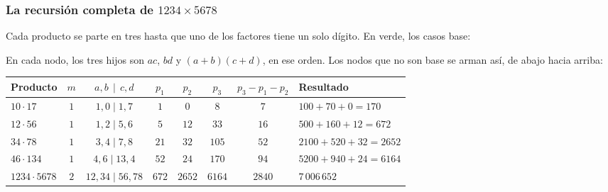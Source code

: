 \documentclass[11pt,letterpaper]{article}
\begin{document}
\subsubsection*{La recursión completa de $1234 \times 5678$}

Cada producto se parte en tres hasta que uno de los factores tiene un
solo dígito. En verde, los casos base:

\begin{center}
\end{center}

En cada nodo, los tres hijos son $ac$, $bd$ y $(a+b)(c+d)$, en ese
orden. Los nodos que no son base se arman así, de abajo hacia arriba:

\begin{center}
\small
\begin{tabular}{lccccccl}
  \toprule
  \textbf{Producto} & $m$ & $a, b \,\mid\, c, d$ & $p_1$ & $p_2$
    & $p_3$ & $p_3 - p_1 - p_2$ & \textbf{Resultado} \\
  \midrule
  $10 \cdot 17$   & $1$ & $1, 0 \mid 1, 7$   & $1$  & $0$  & $8$
    & $7$  & $100 + 70 + 0 = 170$ \\
  $12 \cdot 56$   & $1$ & $1, 2 \mid 5, 6$   & $5$  & $12$ & $33$
    & $16$ & $500 + 160 + 12 = 672$ \\
  $34 \cdot 78$   & $1$ & $3, 4 \mid 7, 8$   & $21$ & $32$ & $105$
    & $52$ & $2100 + 520 + 32 = 2652$ \\
  $46 \cdot 134$  & $1$ & $4, 6 \mid 13, 4$  & $52$ & $24$ & $170$
    & $94$ & $5200 + 940 + 24 = 6164$ \\
  $1234 \cdot 5678$ & $2$ & $12, 34 \mid 56, 78$ & $672$ & $2652$
    & $6164$ & $2840$ & $7\,006\,652$ \\
  \bottomrule
\end{tabular}
\end{center}
\end{document}
